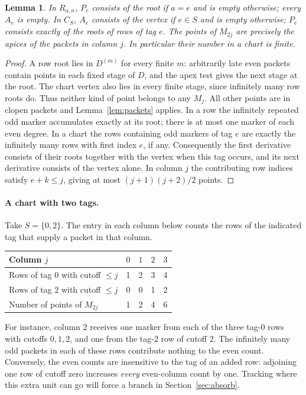 \documentclass[11pt,letterpaper]{article}
\newtheorem{lemma}[theorem]{Lemma}
\theoremstyle{definition}\newtheorem{definition}[theorem]{Definition}
\begin{document}
\begin{lemma}\label{lem:census}
In \(R_{a,n}\), \(P_e\) consists of the root if \(a=e\) and is empty
otherwise; every \(A_e\) is empty. In \(C_S\), \(A_e\) consists of the
vertex if \(e\in S\) and is empty otherwise; \(P_e\) consists exactly of
the roots of rows of tag \(e\). The points of \(M_{2j}\) are precisely the
apices of the packets in column \(j\). In particular their number in a
chart is finite.
\end{lemma}
\begin{proof}
A row root lies in \(D^{(m)}\) for every finite \(m\): arbitrarily late
even packets contain points in each fixed stage of \(D\), and the apex
test gives the next stage at the root. The chart vertex also lies in every
finite stage, since infinitely many row roots do. Thus neither kind of
point belongs to any \(M_j\). All other points are in clopen packets and
Lemma~\ref{lem:packets} applies. In a row the infinitely repeated odd
marker accumulates exactly at its root; there is at most one marker of
each even degree. In a chart the rows containing odd markers of tag \(e\)
are exactly the infinitely many rows with first index \(e\), if any.
Consequently the first derivative consists of their roots together with
the vertex when this tag occurs, and its next derivative consists of the
vertex alone. In column \(j\) the contributing row indices satisfy
\(e+k\le j\), giving at most \((j+1)(j+2)/2\) points.
\end{proof}

\paragraph{A chart with two tags.}
Take \(S=\{0,2\}\). The entry in each column below counts the rows of
the indicated tag that supply a packet in that column.
\begin{center}
\begin{tabular}{@{}lrrrr@{}}
\toprule
Column \(j\) & \(0\) & \(1\) & \(2\) & \(3\)\\
\midrule
Rows of tag \(0\) with cutoff \(\le j\) & 1 & 2 & 3 & 4\\
Rows of tag \(2\) with cutoff \(\le j\) & 0 & 0 & 1 & 2\\
\midrule
Number of points of \(M_{2j}\) & 1 & 2 & 4 & 6\\
\bottomrule
\end{tabular}
\end{center}
For instance, column \(2\) receives one marker from each of the three
tag-\(0\) rows with cutoffs \(0,1,2\), and one from the tag-\(2\) row
of cutoff \(2\). The infinitely many odd packets in each of these rows
contribute nothing to the even count. Conversely, the even counts are
insensitive to the tag of an added row: adjoining one row of cutoff zero
increases \emph{every} even-column count by one. Tracking where this
extra unit can go will force a branch in Section~\ref{sec:absorb}.
\end{document}

